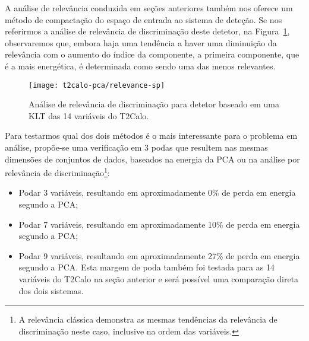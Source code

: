 A análise de relevância conduzida em seções anteriores também nos oferece um
método de compactação do espaço de entrada ao sistema de deteção. Se nos
referirmos a análise de relevância de discriminação deste detetor, na
Figura~\ref{fig:pca-relevance-sp}, observaremos que, embora haja uma tendência
a haver uma diminuição da relevância com o aumento do índice da componente, a
primeira componente, que é a mais energética, é determinada como sendo uma das
menos relevantes.

\begin{figure}
\begin{center}
\texttt{[image: t2calo-pca/relevance-sp]}
\end{center}
\caption{Análise de relevância de discriminação para detetor baseado em uma KLT
das 14 variáveis do T2Calo.}
\label{fig:pca-relevance-sp}
\end{figure}

Para testarmos qual dos dois métodos é o mais interessante para o problema em
análise, propõe-se uma verificação em 3 podas que resultem nas mesmas
dimensões de conjuntos de dados, baseados na energia da PCA ou na análise por
relevância de discriminação\footnote{A relevância clássica demonstra as mesmas
tendências da relevância de discriminação neste caso, inclusive na ordem das
variáveis.}:

\begin{itemize}
\item Podar 3 variáveis, resultando em aproximadamente 0\% de perda em energia
segundo a PCA;
\item Podar 7 variáveis, resultando em aproximadamente 10\% de perda em energia
segundo a PCA;
\item Podar 9 variáveis, resultando em aproximadamente 27\% de perda em
energia segundo a PCA. Esta margem de poda também foi testada para as 14
variáveis do T2Calo na seção anterior e será possível uma comparação direta
dos dois sistemas.
\end{itemize}

